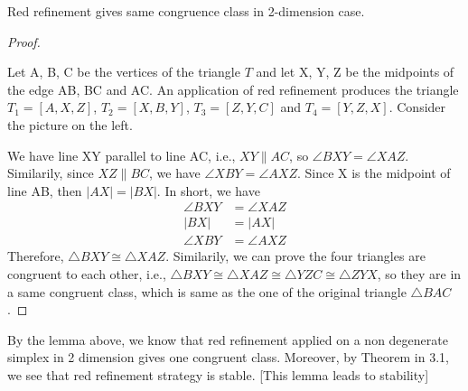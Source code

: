     \begin{lemma*}
    Red refinement gives same congruence class in 2-dimension case.
    \end{lemma*}
    \begin{proof}\mbox{}\\
    \begin{minipage}[c]{4cm}
    
    
    \end{minipage}
    \begin{minipage}[c]{\textwidth-4cm}

    Let A, B, C be the vertices of the triangle $T$ and let X, Y, Z be the midpoints of the edge AB, BC and AC. An application of red refinement produces the triangle $T_1 = [A, X, Z]$, $T_2 = [X, B, Y]$, $T_3 = [Z, Y, C]$ and $T_4 = [Y, Z, X]$. Consider the picture on the left.
    \end{minipage}

    We have line XY parallel to line AC, i.e., $XY \parallel AC$, so $\angle{BXY} = \angle{XAZ}$. Similarily, since $XZ\parallel BC$, we have $\angle{XBY} = \angle{AXZ}$. Since X is the midpoint of line AB, then $|AX| = |BX|$. In short, we have 
    \begin{align*}
    \angle{BXY} &= \angle{XAZ}\\
    |BX| &= |AX|\\
    \angle{XBY} &= \angle{AXZ}
    \end{align*}
    Therefore, $\triangle{BXY} \cong \triangle{XAZ}$. Similarily, we can prove the four triangles are congruent to each other, i.e., $\triangle{BXY}\cong\triangle{XAZ}\cong\triangle{YZC} \cong\triangle{ZYX}$, so they are in a same congruent class, which is same as the one of the original triangle $\triangle{BAC}$.
    \end{proof}
    By the lemma above, we know that red refinement applied on a non degenerate simplex in 2 dimension gives one congruent class. Moreover, by Theorem in 3.1, we see that red refinement strategy is stable.
    [This lemma leads to stability]

